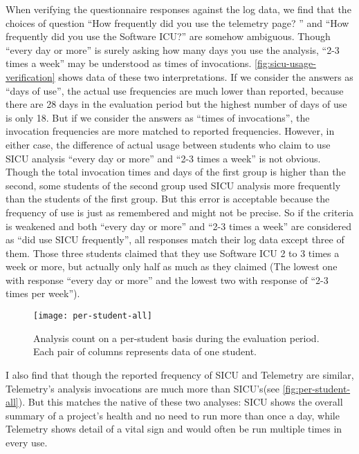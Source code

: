 When verifying the questionnaire responses against the log data, we find that the choices of question ``How frequently did you use the telemetry page? '' and ``How frequently did you use the Software ICU?'' are somehow ambiguous. Though ``every day or more'' is surely asking how many days you use the analysis, ``2-3 times a week'' may be understood as times of invocations. \autoref{fig:sicu-usage-verification} shows data of these two interpretations. If we consider the answers as ``days of use'', the actual use frequencies are much lower than reported, because there are 28 days in the evaluation period but the highest number of days of use is only 18. But if we consider the answers as ``times of invocations'', the invocation frequencies are more matched to reported frequencies. However, in either case, the difference of actual usage between students who claim to use SICU analysis ``every day or more'' and ``2-3 times a week'' is not obvious. Though the total invocation times and days of the first group is higher than the second, some students of the second group used SICU analysis more frequently than the students of the first group. But this error is acceptable because the frequency of use is just as remembered and might not be precise. So if the criteria is weakened and both ``every day or more'' and ``2-3 times a week'' are considered as ``did use SICU frequently'', all responses match their log data except three of them. Those three students claimed that they use Software ICU 2 to 3 times a week or more, but actually only half as much as they claimed (The lowest one with response ``every day or more'' and the lowest two with response of ``2-3 times per week'').

\begin{figure}[htbp] %
   \centering
   \texttt{[image: per-student-all]} 
   \caption{Analysis count on a per-student basis during the evaluation period. Each pair of columns represents data of one student.}
   \label{fig:per-student-all}
\end{figure}

I also find that though the reported frequency of SICU and Telemetry are similar, Telemetry's analysis invocations are much more than SICU's(see \autoref{fig:per-student-all}). But this matches the native of these two analyses: SICU shows the overall summary of a project's health and no need to run more than once a day, while Telemetry shows detail of a vital sign and would often be run multiple times in every use. 

